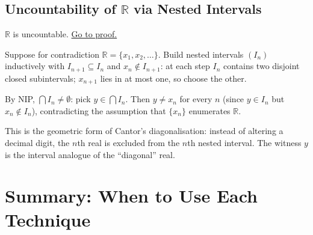 \subsection*{\texorpdfstring{Uncountability of $\mathbb{R}$ via Nested Intervals}{Uncountability of R via Nested Intervals}}
\label{subsec:uncountable}

\begin{proposition}
\label{prop:r-uncountable}
$\mathbb{R}$ is uncountable.
\hyperref[prf:r-uncountable]{Go to proof.}
\end{proposition}

\begin{remark*}
\end{remark*}


\begin{remark}
Suppose for contradiction $\mathbb{R}=\{x_1,x_2,\ldots\}$. Build nested
intervals $(I_n)$ inductively with $I_{n+1}\subseteq I_n$ and
$x_n\notin I_{n+1}$: at each step $I_n$ contains two disjoint closed
subintervals; $x_{n+1}$ lies in at most one, so choose the other.

By NIP, $\bigcap I_n\neq\emptyset$: pick $y\in\bigcap I_n$. Then
$y\neq x_n$ for every $n$ (since $y\in I_n$ but $x_n\notin I_n$),
contradicting the assumption that $\{x_n\}$ enumerates $\mathbb{R}$.
\end{remark}

\begin{remark}
This is the geometric form of Cantor's diagonalisation: instead of
altering a decimal digit, the $n$th real is excluded from the $n$th nested
interval. The witness $y$ is the interval analogue of the ``diagonal'' real.
\end{remark}

\section*{Summary: When to Use Each Technique}

